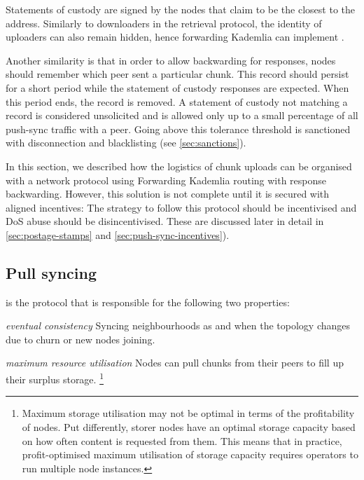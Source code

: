 Statements of custody are signed by the nodes that claim to be the closest to the address. 
Similarly to downloaders in the retrieval protocol, the identity of uploaders can also remain hidden, hence forwarding Kademlia can implement .

Another similarity is that in order to allow backwarding for responses, nodes should remember which peer sent a particular chunk. This record should persist for a short period while the statement of custody responses are expected. When this period ends, the record is removed. A statement of custody not matching a record is considered unsolicited and is allowed only up to a small percentage of all push-sync traffic with a peer. Going above this tolerance threshold is sanctioned with disconnection and blacklisting (see \ref{sec:sanctions}).

In this section, we described how the logistics of chunk uploads can be organised with a network protocol using Forwarding Kademlia routing with response backwarding. However, this solution is not complete until it is secured with aligned incentives: The strategy to follow this protocol should be incentivised and DoS abuse should be disincentivised. These are discussed later in detail in \ref{sec:postage-stamps} and \ref{sec:push-sync-incentives}).

\subsection{Pull syncing\statusgreen}\label{sec:pull-syncing}

 is the protocol that is responsible for the following two properties: 

\begin{labelledlist}
    \item[\emph{eventual consistency}] Syncing neighbourhoods as and when the topology changes due to churn or new nodes joining.
    \item[\emph{maximum resource utilisation}] Nodes can pull chunks from their peers to fill up their surplus storage.%
%
\footnote{Maximum storage utilisation may not be optimal in terms of the profitability of nodes. Put differently, storer nodes have an optimal storage capacity based on how often content is requested from them. This means that in practice, profit-optimised maximum utilisation of storage capacity requires operators to run multiple node instances.}
\end{labelledlist}

